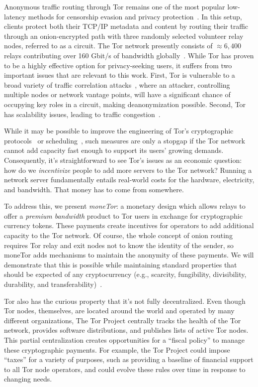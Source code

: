 Anonymous traffic routing through Tor remains one of the most popular low-latency methods for censorship evasion and privacy protection~\cite{dingledine2004tor}.
In this setup, clients protect both their TCP/IP metadata and content by routing their traffic through an onion-encrypted path with three randomly selected volunteer relay nodes, referred to as a circuit.
The Tor network presently consists of $\approx 6,400$ relays contributing over 160 Gbit/s of bandwidth globally~\cite{portal2018tormetrics}.
While Tor has proven to be a highly effective option for privacy-seeking users, it suffers from two important issues that are relevant to this work.
First, Tor is vulnerable to a broad variety of traffic correlation attacks~\cite{wright2004predecessor,murdoch2005low}, where an attacker, controlling multiple nodes or network vantage points, will have a significant chance of occupying key roles in a circuit, making deanonymization possible.
Second, Tor has scalability issues, leading to traffic congestion~\cite{portal2018tormetrics, alsabah2016performance}.

While it may be possible to improve the engineering of Tor's cryptographic protocols~\cite{reardon2009improving} or scheduling~\cite{jansen2014never}, such measures are only a stopgap if the Tor network cannot add capacity fast enough to support its users' growing demands.
Consequently, it's straightforward to see Tor's issues as an economic question: how do we {\em incentivize} people to add more servers to the Tor network?
Running a network server fundamentally entails real-world costs for the hardware, electricity, and bandwidth.
That money has to come from somewhere.

To address this, we present {\em moneTor}: a monetary design which allows relays to offer a \emph{premium bandwidth} product to Tor users in exchange for cryptographic currency tokens.
These payments create incentives for operators to add additional capacity to the Tor network.
Of course, the whole concept of onion routing requires Tor relay and exit nodes not to know the identity of the sender, so moneTor adds mechanisms to maintain the anonymity of these payments.
We will demonstrate that this is possible while maintaining standard properties that should be expected of any cryptocurrency (e.g., scarcity, fungibility, divisibility, durability, and transferability)~\cite[p.3]{crump2011phenomenon}.

Tor also has the curious property that it's not fully decentralized.
Even though Tor nodes, themselves, are located around the world and operated by many different organizations, The Tor Project centrally tracks the health of the Tor network, provides software distributions, and publishes lists of active Tor nodes.
This partial centralization creates opportunities for a ``fiscal policy'' to manage these cryptographic payments.
For example, the Tor Project could impose ``taxes'' for a variety of purposes, such as providing a baseline of financial support to all Tor node operators, and could evolve these rules over time in response to changing needs.

